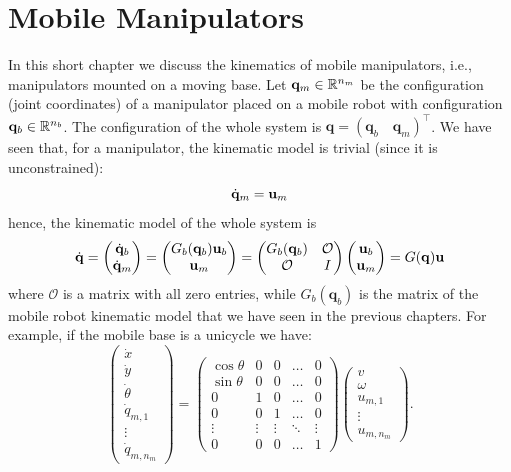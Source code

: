 \documentclass[10pt, a4paper]{report}
\newcommand{\q}{{\mathbf q}}
\begin{document}
\chapter{Mobile Manipulators}
In this short chapter we discuss the kinematics of mobile manipulators, i.e., manipulators mounted on a moving base. Let $\q_m\in\R^{n_m}$ be the configuration (joint coordinates) of a manipulator placed on a mobile robot with configuration $\q_b\in\R^{n_b}$. The configuration of the whole system is $\q=(\q_b\quad\q_m)^\top$. We have seen that, for a manipulator, the kinematic model is trivial (since it is unconstrained):\begin{equation}
    {\dot{\mathbf q}}_m=\mathbf u_m 
\end{equation}
hence, the kinematic model of the whole system is\begin{equation}
    \dq=\begin{pmatrix}
        \dq_b\\\dq_m
    \end{pmatrix}=\begin{pmatrix}
        G_b(\q_b)\mathbf u_b\\ \mathbf u_m 
    \end{pmatrix}=\begin{pmatrix}
        G_b(\q_b)&\mathcal O\\ 
        \mathcal O& I 
    \end{pmatrix}\begin{pmatrix}
        \mathbf u_b\\\mathbf u_m
    \end{pmatrix}=G(\q)\mathbf u 
\end{equation}
where $\mathcal O$ is a matrix with all zero entries, while $G_b(\q_b)$ is the matrix of the mobile robot kinematic model that we have seen in the previous chapters. For example, if the mobile base is a unicycle we have:\begin{equation}
    \begin{pmatrix}
        \dot x\\ \dot y\\ \dot \theta \\ \dot q_{m,1}\\\vdots\\\dot q_{m,n_m}
    \end{pmatrix}=\left(
\begin{array}{cc|ccc}
    \cos\theta & 0 & 0 & \dots & 0 \\
    \sin\theta & 0 & 0 & \dots & 0 \\
    0 & 1 & 0 & \dots & 0 \\
    \hline
    0 & 0 & 1 & \dots & 0 \\
    \vdots & \vdots & \vdots & \ddots & \vdots \\ 
    0 & 0 & 0 & \dots & 1
\end{array}
\right)\begin{pmatrix}
        v\\ \omega\\ u_{m,1}\\\vdots\\u_{m,n_m}
    \end{pmatrix}.
\end{equation}
\end{document}
